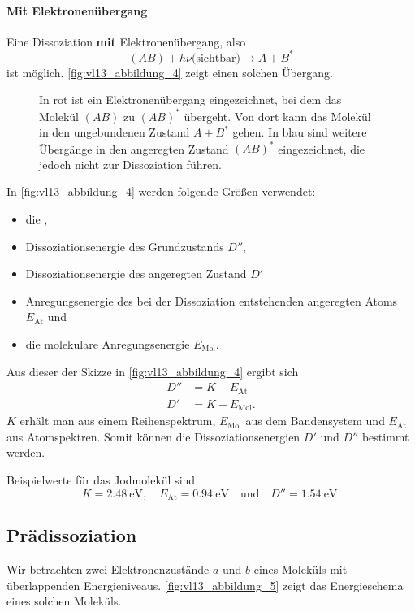 \paragraph{Mit Elektronenübergang}
	Eine Dissoziation \textbf{mit} Elektronenübergang, also
	$$
	(AB) + h \nu \text{(sichtbar)} \to  A+B^{*}
	$$ 
	ist möglich. \autoref{fig:vl13_abbildung_4} zeigt einen solchen Übergang.
	\begin{figure}[H]
		\centering
		\caption{In rot ist ein Elektronenübergang eingezeichnet, bei dem das Molekül $(AB)$ zu $(AB)^*$ übergeht. 
			Von dort kann das Molekül in den ungebundenen Zustand $A+B^*$ gehen.
			In blau sind weitere Übergänge in den angeregten Zustand $(AB)^*$ eingezeichnet, die jedoch nicht zur Dissoziation führen.
		}
		\label{fig:vl13_abbildung_4}
	\end{figure}
In \autoref{fig:vl13_abbildung_4} werden folgende Größen verwendet:
\begin{itemize}
	\item die ,
	\item Dissoziationsenergie des Grundzustands $D''$,
	\item Dissoziationsenergie des angeregten Zustand $D'$
	\item Anregungsenergie des bei der Dissoziation entstehenden angeregten Atoms $E_{\text{At}}$ und
	\item die molekulare Anregungsenergie $E_{\text{Mol}}$.
\end{itemize}
Aus dieser der Skizze in \autoref{fig:vl13_abbildung_4} ergibt sich
\begin{align*}
	D'' &= K-E_\mathrm{At}\\
	D' &= K-E_\mathrm{Mol}.
\end{align*}
$K$ erhält man aus einem Reihenspektrum, $E_\mathrm{Mol}$ aus dem Bandensystem und $E_\mathrm{At}$ aus Atomspektren. Somit können die Dissoziationsenergien $D'$ und $D''$ bestimmt werden.

Beispielwerte für das Jodmolekül  sind $$K = \SI{2,48}{\electronvolt},\quad E_{\text{At}} = \SI{0,94}{\electronvolt} \quad\text{und}\quad D'' = \SI{1,54}{\electronvolt}.$$

\subsection{Prädissoziation} 
	Wir betrachten zwei Elektronenzustände $a$ und $b$ eines Moleküls mit überlappenden Energieniveaus. 
	\autoref{fig:vl13_abbildung_5} zeigt das Energieschema eines solchen Moleküls.

